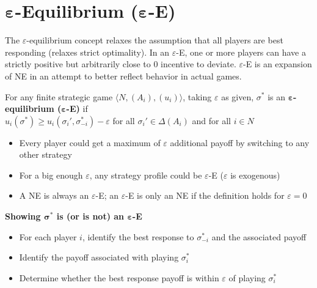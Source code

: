 \documentclass{report}
\newcommand{\FlowerSmall}{\mbox{\raisebox{-1pt}{\small\EightFlowerPetalRemoved}}} %
\begin{document}
\newpage
\section*{$\boldsymbol{\varepsilon}$-Equilibrium ($\boldsymbol{\varepsilon}$-E)}\medskip

The $\varepsilon$-equilibrium concept relaxes the assumption that all players are best responding (relaxes strict optimality). In an $\varepsilon$-E, one or more players can have a strictly positive but arbitrarily close to 0 incentive to deviate. $\varepsilon$-E is an expansion of NE in an attempt to better reflect behavior in actual games. \bigskip \smallskip

For any finite strategic game $\langle N,(A_i),(u_i) \rangle$, taking $\varepsilon$ as given, $\sigma^*$ is an \textbf{$\boldsymbol{\varepsilon}$-equilibrium ($\boldsymbol{\varepsilon}$-E)} if\\ $u_i(\sigma^*) \geq u_i(\sigma_i',\sigma_{-i}^*) - \varepsilon$ for all $\sigma_i' \in \Delta(A_i)$ and for all $i \in N$ 
\begin{itemize}
	\item{Every player could get a maximum of $\varepsilon$ additional payoff by switching to any other strategy}
	\item{For a big enough $\varepsilon$, any strategy profile could be $\varepsilon$-E ($\varepsilon$ is exogenous)}
	\item{A NE is always an $\varepsilon$-E; an $\varepsilon$-E is only an NE if the definition holds for $\varepsilon = 0$}
\end{itemize}

\begin{mdframed}
	\medskip
	\begin{center} \textbf{{\large Showing $\boldsymbol{\sigma^*}$ is (or is not) an $\boldsymbol{\varepsilon}$-E}} \end{center}
	\begin{itemize}[label=\FlowerSmall]
		\item{For each player $i$, identify the best response to $\sigma_{-i}^*$ and the associated payoff}
		\item{Identify the payoff associated with playing $\sigma_i^*$}
		\item{Determine whether the best response payoff is within $\varepsilon$ of playing $\sigma_i^*$}
	\end{itemize}
	\smallskip
\end{mdframed}
\bigskip
\end{document}
